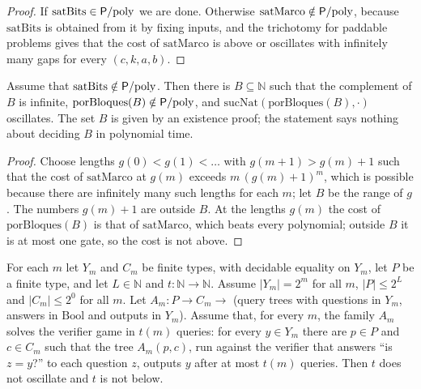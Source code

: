 \begin{proof}
  \leanok
  If $\mathrm{satBits} \in \mathsf{P}/\mathrm{poly}$ we are done. Otherwise $\mathrm{satMarco} \notin \mathsf{P}/\mathrm{poly}$, because $\mathrm{satBits}$
  is obtained from it by fixing inputs, and the trichotomy for paddable problems gives that the cost of $\mathrm{satMarco}$
  is above or oscillates with infinitely many gaps for every $(c, k, a, b)$.
\end{proof}

\begin{theorem}
  \label{thm:infinite-ladner-no-constructivo}
  \leanok
  \own{}
  Assume that $\mathrm{satBits} \notin \mathsf{P}/\mathrm{poly}$. Then there is $B \subseteq \mathbb{N}$ such that the complement of $B$ is
  infinite, $\mathrm{porBloques}(B) \notin \mathsf{P}/\mathrm{poly}$, and $\mathrm{sucNat}(\mathrm{porBloques}(B), \cdot)$ oscillates.
  The set $B$ is given by an existence proof; the statement says nothing about deciding $B$ in polynomial time.
\end{theorem}

\begin{proof}
  \leanok
  Choose lengths $g(0) < g(1) < \dots$ with $g(m+1) > g(m) + 1$ such that the cost of $\mathrm{satMarco}$ at $g(m)$
  exceeds $m\,(g(m)+1)^m$, which is possible because there are infinitely many such lengths for each $m$; let $B$ be the
  range of $g$. The numbers $g(m)+1$ are outside $B$. At the lengths $g(m)$ the cost of $\mathrm{porBloques}(B)$ is that
  of $\mathrm{satMarco}$, which beats every polynomial; outside $B$ it is at most one gate, so the cost is not above.
\end{proof}

\begin{theorem}
  \label{thm:infinite-tiempo-no-oscila}
  \leanok
  \own{}
  For each $m$ let $Y_m$ and $C_m$ be finite types, with decidable equality on $Y_m$, let $P$ be a finite type, and let
  $L \in \mathbb{N}$ and $t : \mathbb{N} \to \mathbb{N}$. Assume $|Y_m| = 2^m$ for all $m$, $|P| \le 2^L$ and
  $|C_m| \le 2^0$ for all $m$. Let $A_m : P \to C_m \to$ (query trees with questions in $Y_m$, answers in $\mathrm{Bool}$
  and outputs in $Y_m$). Assume that, for every $m$, the family $A_m$ solves the verifier game in $t(m)$ queries: for
  every $y \in Y_m$ there are $p \in P$ and $c \in C_m$ such that the tree $A_m(p, c)$, run against the verifier that
  answers ``is $z = y$?'' to each question $z$, outputs $y$ after at most $t(m)$ queries. Then $t$ does not oscillate
  and $t$ is not below.
\end{theorem}


